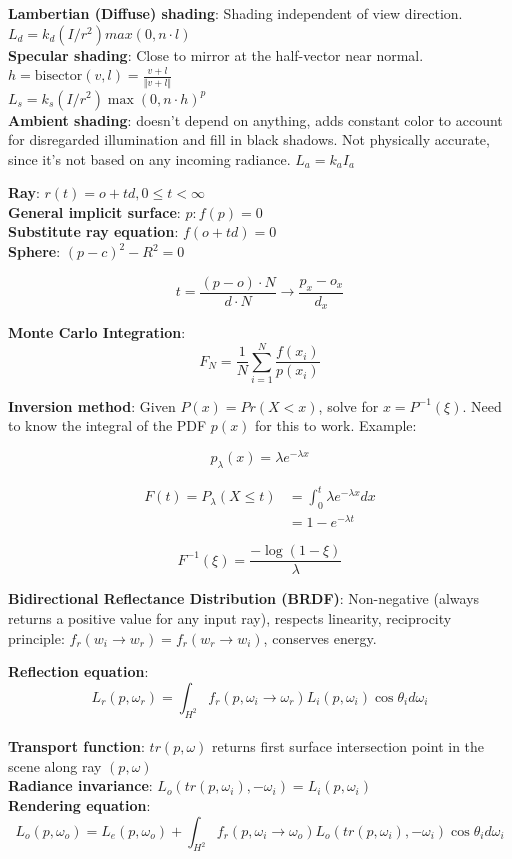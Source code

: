 \documentclass[9pt,landscape]{extarticle}
\begin{document}
\begin{multicols}{3}
\textbf{Lambertian (Diffuse) shading}: Shading independent of view direction. $L_d = k_d (I / r^2) max(0, n\cdot l)$ \\
\textbf{Specular shading}: Close to mirror at the half-vector near normal. $h = \text{bisector}(v, l) = \frac{v + l}{\Vert v + l \Vert}$ \\
$L_s = k_s(I / r^2) \max(0, n \cdot h)^p$ \\
\textbf{Ambient shading}: doesn't depend on anything, adds constant color to account for disregarded illumination and fill in black shadows. Not physically accurate, since it's not based on any incoming radiance. $L_a = k_a I_a$

\textbf{Ray}: $r(t) = o + td, 0 \le t < \infty$ \\
\textbf{General implicit surface}: $p: f(p) = 0$ \\
\textbf{Substitute ray equation}: $f(o + td) = 0$ \\
\textbf{Sphere}: $(p - c)^2 - R^2 = 0$

$$t = \frac{(p - o) \cdot N}{d \cdot N} \rightarrow \frac{p_x - o_x}{d_x}$$

\textbf{Monte Carlo Integration}: $$F_N = \frac{1}{N} \sum_{i=1}^N \frac{f(x_i)}{p(x_i)}$$

\textbf{Inversion method}: Given $P(x) = Pr(X < x)$, solve for $x = P^{-1}(\xi)$. Need to know the integral of the PDF $p(x)$ for this to work. Example:

$$p_\lambda(x) = \lambda e^{-\lambda x}$$

$$\begin{aligned}
F(t) = P_\lambda(X \le t) &= \int_0^t \lambda e^{-\lambda x} dx \\
                          &= 1 - e^{-\lambda t}
\end{aligned}$$

$$F^{-1}(\xi) = \frac{-\log(1 - \xi)}{\lambda}$$

\textbf{Bidirectional Reflectance Distribution (BRDF)}: Non-negative (always returns a positive value for any input ray), respects linearity, reciprocity principle: $f_r(w_i \rightarrow w_r) = f_r(w_r \rightarrow w_i)$, conserves energy.

\textbf{Reflection equation}: $$
L_r(p, \omega_r) = \int_{H^2} f_r(p, \omega_i \rightarrow \omega_r) L_i(p, \omega_i) \cos \theta_i d\omega_i
$$ \\
\textbf{Transport function}: $tr(p, \omega)$ returns first surface intersection point in the scene along ray $(p, \omega)$ \\
\textbf{Radiance invariance}: $L_o(tr(p, \omega_i), -\omega_i) = L_i(p, \omega_i)$ \\
\textbf{Rendering equation}: $$
L_o(p, \omega_o) = L_e(p, \omega_o) + \int_{H^2} f_r(p, \omega_i \rightarrow \omega_o) L_o(tr(p, \omega_i), -\omega_i) \cos\theta_i d\omega_i
$$


\end{multicols}
\end{document}
